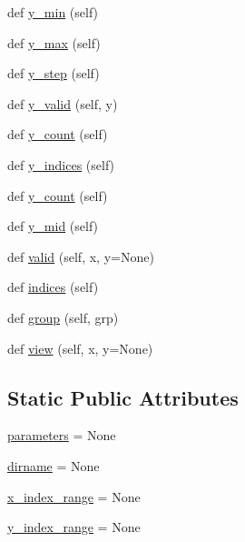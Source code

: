 \begin{DoxyCompactItemize}
\item 
def \hyperlink{classpylib_1_1dataset_1_1Dataset_ae8e287eba69d1695fd081dc3443f6931}{y\+\_\+min} (self)
\item 
def \hyperlink{classpylib_1_1dataset_1_1Dataset_a065f04048382510d74f3b57b32a33557}{y\+\_\+max} (self)
\item 
def \hyperlink{classpylib_1_1dataset_1_1Dataset_aa938f3a5c34d2df401bb2eafce79f6bd}{y\+\_\+step} (self)
\item 
def \hyperlink{classpylib_1_1dataset_1_1Dataset_a62f5ba4716218f6918aa6a7bf5a037ab}{y\+\_\+valid} (self, y)
\item 
def \hyperlink{classpylib_1_1dataset_1_1Dataset_ad90a47da1aac720ab2440c4e58492985}{y\+\_\+count} (self)
\item 
def \hyperlink{classpylib_1_1dataset_1_1Dataset_a6804bc3704169d6c698818eac89f37b5}{y\+\_\+indices} (self)
\item 
def \hyperlink{classpylib_1_1dataset_1_1Dataset_ad90a47da1aac720ab2440c4e58492985}{y\+\_\+count} (self)
\item 
def \hyperlink{classpylib_1_1dataset_1_1Dataset_a7963496eddca992eb14214df8ee12c3a}{y\+\_\+mid} (self)
\item 
def \hyperlink{classpylib_1_1dataset_1_1Dataset_ae0e77488bf3e5d29ed41f157daa61585}{valid} (self, x, y=None)
\item 
def \hyperlink{classpylib_1_1dataset_1_1Dataset_aac691740b09f423e5c893a5ed661973c}{indices} (self)
\item 
def \hyperlink{classpylib_1_1dataset_1_1Dataset_aa262d92adc50d3f5c57bf78cfd275514}{group} (self, grp)
\item 
def \hyperlink{classpylib_1_1dataset_1_1Dataset_ace681fbf890d3a6b669fb08a62f506e9}{view} (self, x, y=None)
\end{DoxyCompactItemize}
\subsection*{Static Public Attributes}
\begin{DoxyCompactItemize}
\item 
\hyperlink{classpylib_1_1dataset_1_1Dataset_a204b597a0941f5c01cebc76df738a8b0}{parameters} = None
\item 
\hyperlink{classpylib_1_1dataset_1_1Dataset_aa4bff0fa5813ca7c1441c4b14a8212c9}{dirname} = None
\item 
\hyperlink{classpylib_1_1dataset_1_1Dataset_a60bba281477afcad716427a8b0649492}{x\+\_\+index\+\_\+range} = None
\item 
\hyperlink{classpylib_1_1dataset_1_1Dataset_a307b60438a0779b7e96d971a0d5c4be6}{y\+\_\+index\+\_\+range} = None
\end{DoxyCompactItemize}


